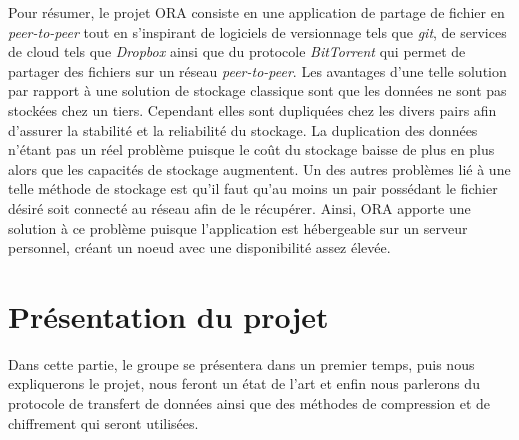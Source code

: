 \documentclass[11pt, a4paper]{specifications}
\begin{document}
Pour résumer, le projet ORA consiste en une application de partage de fichier en \textit{peer-to-peer} tout en s'inspirant de logiciels de versionnage tels que \textit{git}, de services de cloud tels que \textit{Dropbox} ainsi que du protocole \textit{BitTorrent} qui permet de partager des fichiers sur un réseau \textit{peer-to-peer}. \newline
Les avantages d'une telle solution par rapport à une solution de stockage classique sont que les données ne sont pas stockées chez un tiers. Cependant elles sont dupliquées chez les divers pairs afin d'assurer la stabilité et la reliabilité du stockage. La duplication des données n'étant pas un réel problème puisque le coût du stockage baisse de plus en plus alors que les capacités de stockage augmentent. \newline
Un des autres problèmes lié à une telle méthode de stockage est qu'il faut qu'au moins un pair possédant le fichier désiré soit connecté au réseau afin de le récupérer. Ainsi, ORA apporte une solution à ce problème puisque l'application est hébergeable sur un serveur personnel, créant un noeud avec une disponibilité assez élevée.
\clearpage

  \section{Présentation du projet}
Dans cette partie, le groupe se présentera dans un premier temps, puis nous expliquerons le projet, nous feront un état de l'art et enfin nous parlerons du protocole de transfert de données ainsi que des méthodes de compression et de chiffrement qui seront utilisées.
\end{document}
